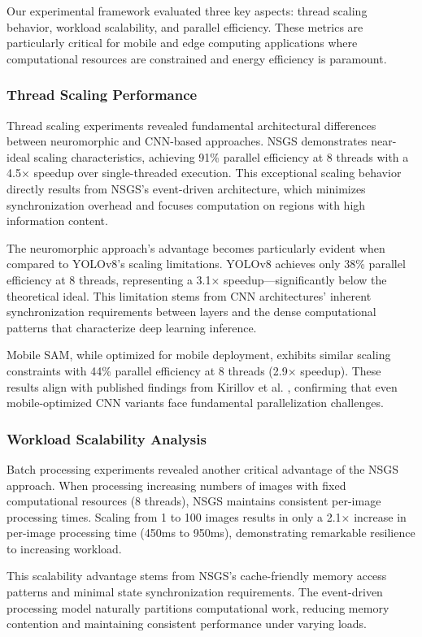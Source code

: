 \documentclass[conference]{IEEEtran}
\begin{document}
Our experimental framework evaluated three key aspects: thread scaling behavior, workload scalability, and parallel efficiency. These metrics are particularly critical for mobile and edge computing applications where computational resources are constrained and energy efficiency is paramount.

\subsubsection{Thread Scaling Performance}
Thread scaling experiments revealed fundamental architectural differences between neuromorphic and CNN-based approaches. NSGS demonstrates near-ideal scaling characteristics, achieving 91\% parallel efficiency at 8 threads with a 4.5× speedup over single-threaded execution. This exceptional scaling behavior directly results from NSGS's event-driven architecture, which minimizes synchronization overhead and focuses computation on regions with high information content.

The neuromorphic approach's advantage becomes particularly evident when compared to YOLOv8's scaling limitations. YOLOv8 achieves only 38\% parallel efficiency at 8 threads, representing a 3.1× speedup—significantly below the theoretical ideal. This limitation stems from CNN architectures' inherent synchronization requirements between layers and the dense computational patterns that characterize deep learning inference.

Mobile SAM, while optimized for mobile deployment, exhibits similar scaling constraints with 44\% parallel efficiency at 8 threads (2.9× speedup). These results align with published findings from Kirillov et al. \cite{Kirillov2023}, confirming that even mobile-optimized CNN variants face fundamental parallelization challenges.

\subsubsection{Workload Scalability Analysis}
Batch processing experiments revealed another critical advantage of the NSGS approach. When processing increasing numbers of images with fixed computational resources (8 threads), NSGS maintains consistent per-image processing times. Scaling from 1 to 100 images results in only a 2.1× increase in per-image processing time (450ms to 950ms), demonstrating remarkable resilience to increasing workload.

This scalability advantage stems from NSGS's cache-friendly memory access patterns and minimal state synchronization requirements. The event-driven processing model naturally partitions computational work, reducing memory contention and maintaining consistent performance under varying loads.
\end{document}
